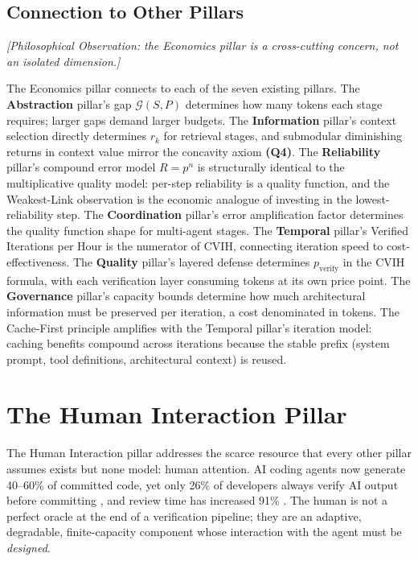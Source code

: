 \documentclass[11pt, a4paper]{googledeepmind}
\begin{document}
\subsection{Connection to Other Pillars}

\emph{[Philosophical Observation: the Economics pillar is a cross-cutting concern, not an isolated dimension.]}

The Economics pillar connects to each of the seven existing pillars. The \textbf{Abstraction} pillar's gap $\mathcal{G}(S,P)$ determines how many tokens each stage requires; larger gaps demand larger budgets. The \textbf{Information} pillar's context selection directly determines $r_k$ for retrieval stages, and submodular diminishing returns in context value mirror the concavity axiom \textbf{(Q4)}. The \textbf{Reliability} pillar's compound error model $R = p^n$ is structurally identical to the multiplicative quality model: per-step reliability is a quality function, and the Weakest-Link observation is the economic analogue of investing in the lowest-reliability step. The \textbf{Coordination} pillar's error amplification factor determines the quality function shape for multi-agent stages. The \textbf{Temporal} pillar's Verified Iterations per Hour is the numerator of CVIH, connecting iteration speed to cost-effectiveness. The \textbf{Quality} pillar's layered defense determines $p_{\text{verify}}$ in the CVIH formula, with each verification layer consuming tokens at its own price point. The \textbf{Governance} pillar's capacity bounds determine how much architectural information must be preserved per iteration, a cost denominated in tokens. The Cache-First principle amplifies with the Temporal pillar's iteration model: caching benefits compound across iterations because the stable prefix (system prompt, tool definitions, architectural context) is reused.


\section{The Human Interaction Pillar}
\label{sec:human}

The Human Interaction pillar addresses the scarce resource that every other pillar assumes exists but none model: human attention. AI coding agents now generate 40--60\% of committed code, yet only 26\% of developers always verify AI output before committing \citep{sonar2026}, and review time has increased 91\% \citep{dora2025}. The human is not a perfect oracle at the end of a verification pipeline; they are an adaptive, degradable, finite-capacity component whose interaction with the agent must be \emph{designed}.
\end{document}

